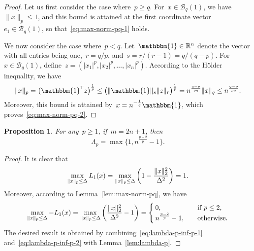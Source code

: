 \documentclass[draft]{article}
\numberwithin{equation}{section}
\theoremstyle{definition}
\theoremstyle{plain}
\newtheorem{proposition}{Proposition}[section]
\theoremstyle{remark}
\newcommand*{\abs}[2][]{#1\lvert#2#1\rvert}
\newcommand*{\lagp}[1][]{L\ifblank{#1}{}{_{#1}}}
\newcommand*{\norm}[2][]{#1\lVert#2#1\rVert}
\newcommand*{\R}{\mathbb{R}}
\newcommand*{\set}[2][]{#1\{#2#1\}}
\newcommand*{\T}{\mathsf{T}}
\newcommand{\ones}{\mathbbm{1}}
\begin{document}
\begin{proof}
    Let us first consider the case where~$p \ge q$.
    For~$x \in \mathcal{B}_q(1)$, we have~$\norm{x}_p \le 1$, and this bound is attained at the first coordinate vector~$e_1 \in \mathcal{B}_q(1)$, so that~\eqref{eq:max-norm-pq-1} holds.

    We now consider the case where~$p < q$.
    Let~$\ones \in \R^n$ denote the vector with all entries being one,~$r = q/p$, and~$s = r / (r - 1) = q / (q - p)$.
    For~$x \in \mathcal{B}_q(1)$, define~$z = (\abs{x_1}^p, \abs{x_2}^p, \dots, \abs{x_n}^p)$.
    According to the H{\"{o}}lder inequality, we have
    \begin{equation*}
        \norm{x}_p  = \big(\ones^{\T} z \big)^{\frac{1}{p}} \le \big(\norm{\ones}_s \norm{z}_r \big)^{\frac{1}{p}} = n^{\frac{q - p}{pq}} \norm{x}_q \le n^{\frac{q - p}{pq}}.
    \end{equation*}
    Moreover, this bound is attained by~$x = n^{-\frac{1}{q}}\ones$, which proves~\eqref{eq:max-norm-pq-2}.
\end{proof}

\begin{proposition}
    \label{prop:lambda-p-opt}
    For any~$p \ge 1$, if~$m = 2n + 1$, then
    \begin{equation*}
        \Lambda_p = \max \set[\big]{1, n^{\frac{p - 2}{p}} - 1}.
    \end{equation*}
\end{proposition}

\begin{proof}
    It is clear that
    \begin{equation}
        \label{eq:lambda-p-inf-p-1}
        \max_{\norm{x}_p \le \Delta} \lagp[1](x) = \max_{\norm{x}_p \le \Delta} \bigg( 1 - \frac{\norm{x}_2^2}{\Delta^2} \bigg) = 1.
    \end{equation}
    Moreover, according to Lemma~\ref{lem:max-norm-pq}, we have
    \begin{equation}
        \label{eq:lambda-p-inf-p-2}
        \max_{\norm{x}_p \le \Delta} -\lagp[1](x) = \max_{\norm{x}_p \le \Delta} \bigg( \frac{\norm{x}_2^2}{\Delta^2} - 1 \bigg) =
        \begin{cases}
            0,                          & \quad \text{if~$p \le 2$,}\\
            n^{\frac{p - 2}{p}} - 1,    & \quad \text{otherwise.}
        \end{cases}
    \end{equation}
    The desired result is obtained by combining~\eqref{eq:lambda-p-inf-p-1} and~\eqref{eq:lambda-p-inf-p-2} with Lemma~\ref{lem:lambda-p}.
\end{proof}
\end{document}
